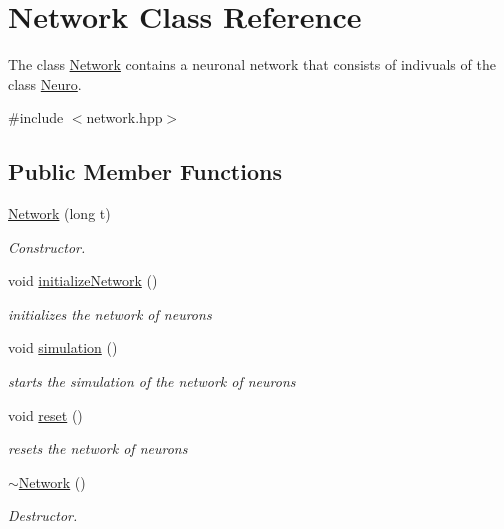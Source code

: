 \hypertarget{classNetwork}{\section{Network Class Reference}
\label{classNetwork}
}


The class \hyperlink{classNetwork}{Network} contains a neuronal network that consists of indivuals of the class \hyperlink{classNeuro}{Neuro}.  




{\ttfamily \#include $<$network.\-hpp$>$}

\subsection*{Public Member Functions}
\begin{DoxyCompactItemize}
\item 
\hyperlink{classNetwork_ab77c609c94083d6a16efaf695eec37c7}{Network} (long t)
\begin{DoxyCompactList}\small\item\em Constructor. \end{DoxyCompactList}\item 
void \hyperlink{classNetwork_aecc4f34723979865c133409b28c36e40}{initialize\-Network} ()
\begin{DoxyCompactList}\small\item\em initializes the network of neurons \end{DoxyCompactList}\item 
void \hyperlink{classNetwork_ad1bc5e435a8a2382e557ae00a9e7831c}{simulation} ()
\begin{DoxyCompactList}\small\item\em starts the simulation of the network of neurons \end{DoxyCompactList}\item 
void \hyperlink{classNetwork_a320db3d014ddbc7046984fc7d26c1bd5}{reset} ()
\begin{DoxyCompactList}\small\item\em resets the network of neurons \end{DoxyCompactList}\item 
\hypertarget{classNetwork_a7a4e19cdb4bf0c7ecf82baa643831492}{\hyperlink{classNetwork_a7a4e19cdb4bf0c7ecf82baa643831492}{$\sim$\-Network} ()}\label{classNetwork_a7a4e19cdb4bf0c7ecf82baa643831492}

\begin{DoxyCompactList}\small\item\em Destructor. \end{DoxyCompactList}\end{DoxyCompactItemize}
